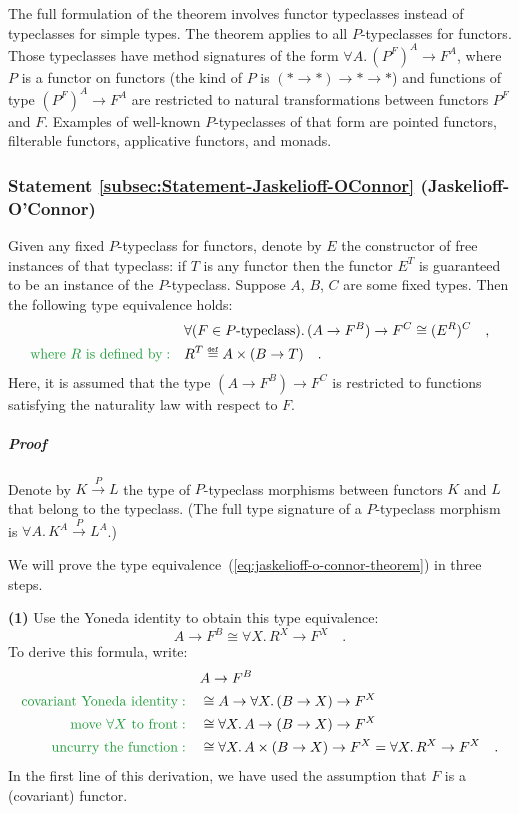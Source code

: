 The full formulation of the theorem involves functor typeclasses instead
of typeclasses for simple types. The theorem applies to all $P$-typeclasses
for functors. Those typeclasses have method signatures of the form
$\forall A.\,(P^{F})^{A}\rightarrow F^{A}$, where $P$ is a functor
on functors (the kind of $P$ is $(*\rightarrow*)\rightarrow*\rightarrow*$)
and functions of type $(P^{F})^{A}\rightarrow F^{A}$ are restricted
to natural transformations between functors $P^{F}$ and $F$. Examples
of well-known $P$-typeclasses of that form are pointed functors,
filterable functors, applicative functors, and monads.

\subsubsection{Statement \label{subsec:Statement-Jaskelioff-OConnor}\ref{subsec:Statement-Jaskelioff-OConnor}
(Jaskelioff-O\textsf{'}Connor)}

Given any fixed $P$-typeclass for functors, denote by $E$ the constructor
of free instances of that typeclass: if $T$ is any functor then the
functor $E^{T}$ is guaranteed to be an instance of the $P$-typeclass.
Suppose $A$, $B$, $C$ are some fixed types. Then the following
type equivalence holds:
\begin{align}
 & \forall(F\in P\text{-typeclass}).\,(A\rightarrow F^{B})\rightarrow F^{C}\cong(E^{R})^{C}\quad,\label{eq:jaskelioff-o-connor-theorem}\\
{\color{greenunder}\text{where }R\text{ is defined by}:}\quad & R^{T}\triangleq A\times(B\rightarrow T)\quad.\nonumber 
\end{align}
Here, it is assumed that the type $(A\rightarrow F^{B})\rightarrow F^{C}$
is restricted to functions satisfying the naturality law with respect
to $F$.

\subparagraph{Proof}

Denote by $K\overset{P}{\rightarrow}L$ the type of $P$-typeclass
morphisms between functors $K$ and $L$ that belong to the typeclass.
(The full type signature of a $P$-typeclass morphism is $\forall A.\,K^{A}\overset{P}{\rightarrow}L^{A}$.)

We will prove the type equivalence~(\ref{eq:jaskelioff-o-connor-theorem})
in three steps.

\textbf{(1)} Use the Yoneda identity to obtain this type equivalence:
\[
A\rightarrow F^{B}\cong\forall X.\,R^{X}\rightarrow F^{X}\quad.
\]
To derive this formula, write:
\begin{align*}
 & A\rightarrow F^{B}\\
{\color{greenunder}\text{covariant Yoneda identity}:}\quad & \cong A\rightarrow\forall X.\,(B\rightarrow X)\rightarrow F^{X}\\
{\color{greenunder}\text{move }\forall X\text{ to front}:}\quad & \cong\forall X.\,A\rightarrow(B\rightarrow X)\rightarrow F^{X}\\
{\color{greenunder}\text{uncurry the function}:}\quad & \cong\forall X.\,A\times(B\rightarrow X)\rightarrow F^{X}=\forall X.\,R^{X}\rightarrow F^{X}\quad.
\end{align*}
In the first line of this derivation, we have used the assumption
that $F$ is a (covariant) functor.

